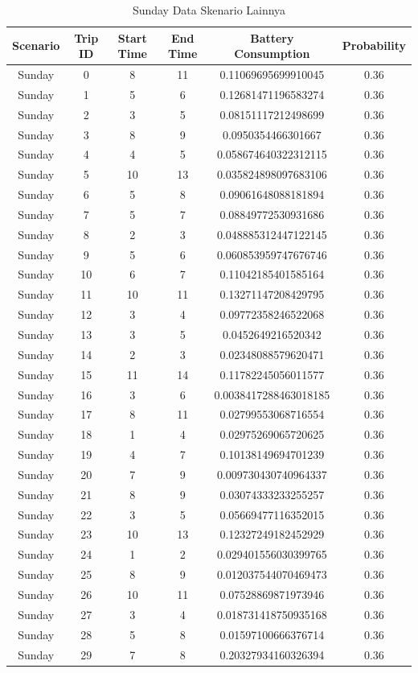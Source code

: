 \documentclass{skripsimathugm}
\begin{document}
\begin{table}[H]
\centering
\caption{Sunday Data Skenario Lainnya}
\label{Sunday Data Skenario Lainnya}
\begin{tabular}{|c|c|c|c|c|c|}
\hline
\textbf{Scenario} & \textbf{Trip ID} & \textbf{Start Time} & \textbf{End Time} & \textbf{Battery Consumption} & \textbf{Probability} \\
\hline
Sunday & 0 & 8 & 11 & 0.11069695699910045 & 0.36 \\
Sunday & 1 & 5 & 6 & 0.12681471196583274 & 0.36 \\
Sunday & 2 & 3 & 5 & 0.08151117212498699 & 0.36 \\
Sunday & 3 & 8 & 9 & 0.0950354466301667 & 0.36 \\
Sunday & 4 & 4 & 5 & 0.058674640322312115 & 0.36 \\
Sunday & 5 & 10 & 13 & 0.035824898097683106 & 0.36 \\
Sunday & 6 & 5 & 8 & 0.09061648088181894 & 0.36 \\
Sunday & 7 & 5 & 7 & 0.08849772530931686 & 0.36 \\
Sunday & 8 & 2 & 3 & 0.048885312447122145 & 0.36 \\
Sunday & 9 & 5 & 6 & 0.060853959747676746 & 0.36 \\
Sunday & 10 & 6 & 7 & 0.11042185401585164 & 0.36 \\
Sunday & 11 & 10 & 11 & 0.13271147208429795 & 0.36 \\
Sunday & 12 & 3 & 4 & 0.09772358246522068 & 0.36 \\
Sunday & 13 & 3 & 5 & 0.0452649216520342 & 0.36 \\
Sunday & 14 & 2 & 3 & 0.02348088579620471 & 0.36 \\
Sunday & 15 & 11 & 14 & 0.11782245056011577 & 0.36 \\
Sunday & 16 & 3 & 6 & 0.0038417288463018185 & 0.36 \\
Sunday & 17 & 8 & 11 & 0.02799553068716554 & 0.36 \\
Sunday & 18 & 1 & 4 & 0.02975269065720625 & 0.36 \\
Sunday & 19 & 4 & 7 & 0.10138149694701239 & 0.36 \\
Sunday & 20 & 7 & 9 & 0.009730430740964337 & 0.36 \\
Sunday & 21 & 8 & 9 & 0.03074333233255257 & 0.36 \\
Sunday & 22 & 3 & 5 & 0.05669477116352015 & 0.36 \\
Sunday & 23 & 10 & 13 & 0.12327249182452929 & 0.36 \\
Sunday & 24 & 1 & 2 & 0.029401556030399765 & 0.36 \\
Sunday & 25 & 8 & 9 & 0.012037544070469473 & 0.36 \\
Sunday & 26 & 10 & 11 & 0.07528869871973946 & 0.36 \\
Sunday & 27 & 3 & 4 & 0.018731418750935168 & 0.36 \\
Sunday & 28 & 5 & 8 & 0.01597100666376714 & 0.36 \\
Sunday & 29 & 7 & 8 & 0.20327934160326394 & 0.36 \\
\hline
\end{tabular}
\end{table}
\end{document}
